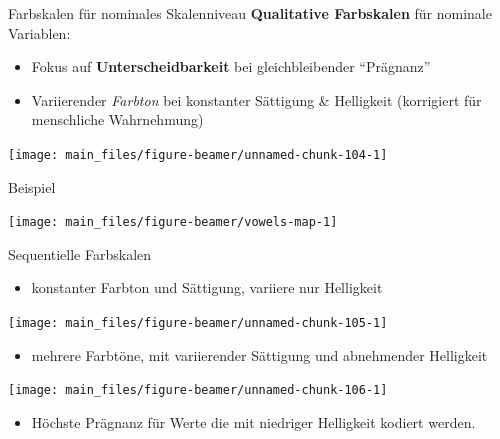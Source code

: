 \documentclass[
  10pt,
  ignorenonframetext,
]{beamer}
\providecommand{\tightlist}{%
  \setlength{\itemsep}{0pt}\setlength{\parskip}{0pt}}
\begin{document}
\begin{frame}{Farbskalen für nominales Skalenniveau}
\label{farbskalen-fuxfcr-nominales-skalenniveau}
\textbf{Qualitative Farbskalen} für nominale Variablen:

\begin{itemize}
\tightlist
\item
  Fokus auf \textbf{Unterscheidbarkeit} bei gleichbleibender
  ``Prägnanz''
\item
  Variierender \emph{Farbton} bei konstanter Sättigung \& Helligkeit
  (korrigiert für menschliche Wahrnehmung) \scriptsize
\end{itemize}

\begin{center}\texttt{[image: main\_files/figure-beamer/unnamed-chunk-104-1]} \end{center}

\normalsize
\end{frame}

\begin{frame}{Beispiel}
\label{beispiel}
\scriptsize\normalsize

\scriptsize\normalsize

\scriptsize

\begin{center}\texttt{[image: main\_files/figure-beamer/vowels-map-1]} \end{center}

\normalsize
\end{frame}

\begin{frame}{Sequentielle Farbskalen}
\label{sequentielle-farbskalen}
\begin{itemize}
\tightlist
\item
  konstanter Farbton und Sättigung, variiere nur Helligkeit \scriptsize
\end{itemize}

\begin{center}\texttt{[image: main\_files/figure-beamer/unnamed-chunk-105-1]} \end{center}

\normalsize

\begin{itemize}
\tightlist
\item
  mehrere Farbtöne, mit variierender Sättigung und abnehmender
  Helligkeit \scriptsize
\end{itemize}

\begin{center}\texttt{[image: main\_files/figure-beamer/unnamed-chunk-106-1]} \end{center}

\normalsize

\begin{itemize}
\tightlist
\item
  Höchste Prägnanz für Werte die mit niedriger Helligkeit kodiert
  werden.
\end{itemize}
\end{frame}
\end{document}
